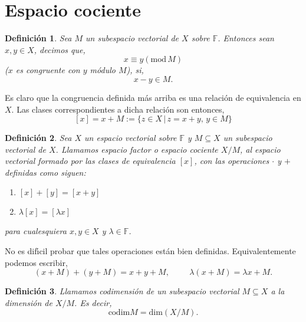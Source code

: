 \documentclass[12pt]{book}
\newtheorem{defn}{\bf Definición}[chapter]
\begin{document}
\section{Espacio cociente}
\begin{defn} Sea $M$ un subespacio vectorial de $X$ sobre $\mathbb{F}$. Entonces sean $x,y\in 
X$, decimos que,
$$x\equiv y (\textrm{mod}\, M)$$
($x$ es congruente con $y$ m\'odulo $M$), si,
$$x-y\in M.$$
\end{defn}
Es claro que la congruencia definida m\'as arriba es una relaci\'on de equivalencia en $X$. Las 
clases correspondientes a dicha relaci\'on son entonces,
$$[x]=x+M:=\{z\in X\,|\, z=x+y,\, y\in M\}$$


\begin{defn} Sea $X$ un espacio vectorial sobre $\mathbb{F}$ y $M\subseteq X$ un subespacio 
vectorial de $X$. Llamamos espacio factor o espacio cociente $X/M$, al espacio vectorial formado 
por las clases de equivalencia $[x]$, con las operaciones $\cdot$ y $+$ definidas como siguen:
\begin{enumerate}
\item $[x]+[y]=[x+y]$
\item $\lambda[x] = [\lambda x]$
\end{enumerate}
para cualesquiera $x,y\in X$ y $\lambda \in \mathbb{F}$.
\end{defn}
 No es dif\'{\i}cil probar que tales operaciones est\'an bien definidas. Equivalentemente podemos 
escribir,
 $$(x+M)+(y+M)=x+y+M,\hspace{1cm}\lambda(x+M)= \lambda x +M.$$
 
 \begin{defn} Llamamos codimensi\'on de un subespacio vectorial $M\subseteq X$ a la dimensi\'on 
de $X/M$. Es decir,
 $$\textrm{codim} M=\textrm{dim}(X/M).$$
 \end{defn}
 
\end{document}
